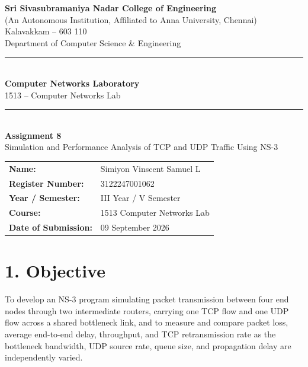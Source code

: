 \documentclass[11pt]{article}
\title{\vspace{-2cm}}
\date{}
\begin{document}
\begin{titlepage}
\centering
\vspace*{1cm}
{\large \textbf{Sri Sivasubramaniya Nadar College of Engineering}}\\
{\small (An Autonomous Institution, Affiliated to Anna University, Chennai)}\\
{\small Kalavakkam -- 603 110}\\[0.3cm]
{\small Department of Computer Science \& Engineering}\\[1.5cm]

\rule{\linewidth}{0.5mm}\\[0.4cm]
{\LARGE \textbf{Computer Networks Laboratory}}\\[0.3cm]
{\Large 1513 -- Computer Networks Lab}\\[0.4cm]
\rule{\linewidth}{0.5mm}\\[1.5cm]

{\huge \textbf{Assignment 8}}\\[0.4cm]
{\Large Simulation and Performance Analysis of TCP and UDP Traffic Using NS-3}\\[2cm]

\begin{center}
\begin{tabular}{ll}
\textbf{Name:} & Simiyon Vinscent Samuel L \\[0.2cm]
\textbf{Register Number:} & 3122247001062 \\[0.2cm]
\textbf{Year / Semester:} & III Year / V Semester \\[0.2cm]
\textbf{Course:} & 1513 Computer Networks Lab \\[0.2cm]
\textbf{Date of Submission:} & 09 September 2026 \\[0.2cm]
\end{tabular}
\end{center}

\vfill
\end{titlepage}

\section*{1. Objective}
To develop an NS-3 program simulating packet transmission between four end
nodes through two intermediate routers, carrying one TCP flow and one UDP
flow across a shared bottleneck link, and to measure and compare packet
loss, average end-to-end delay, throughput, and TCP retransmission rate as
the bottleneck bandwidth, UDP source rate, queue size, and propagation
delay are independently varied.
\end{document}
